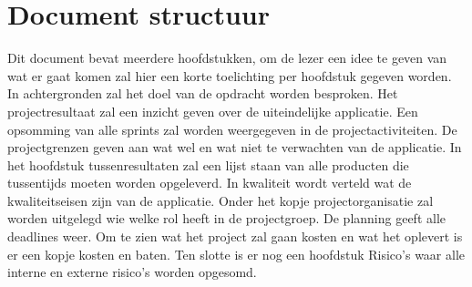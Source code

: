 \section{Document structuur} \label{sec:structure}
Dit document bevat meerdere hoofdstukken, om de lezer een idee te geven van wat er gaat komen zal hier een korte toelichting per hoofdstuk gegeven worden. In achtergronden zal het doel van de opdracht worden besproken. Het projectresultaat zal een inzicht geven over de uiteindelijke applicatie. Een opsomming van alle sprints zal worden weergegeven in de projectactiviteiten. De projectgrenzen geven aan wat wel en wat niet te verwachten van de applicatie. In het hoofdstuk tussenresultaten zal een lijst staan van alle producten die tussentijds moeten worden opgeleverd. In kwaliteit wordt verteld wat de kwaliteitseisen zijn van de applicatie. Onder het kopje projectorganisatie zal worden uitgelegd wie welke rol heeft in de projectgroep. De planning geeft alle deadlines weer. Om te zien wat het project zal gaan kosten en wat het oplevert is er een kopje kosten en baten. Ten slotte is er nog een hoofdstuk Risico's waar alle interne en externe risico's worden opgesomd.